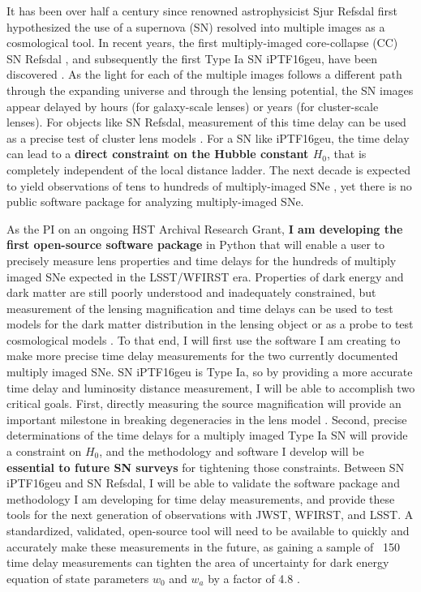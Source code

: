 It has been over half a century since renowned astrophysicist Sjur
Refsdal first hypothesized the use of a supernova (SN) resolved into
multiple images as a cosmological tool. In recent years, the first
multiply-imaged core-collapse (CC) SN Refsdal \citep{Kelly:2015a}, and
subsequently the first Type Ia SN iPTF16geu, have been discovered
\citep{Goobar:2016}. As the light for each of the multiple images
follows a different path through the expanding universe and through
the lensing potential, the SN images appear delayed by hours (for
galaxy-scale lenses) or years (for cluster-scale lenses). For objects
like SN Refsdal, measurement of this time delay can be used as a
precise test of cluster lens models \citep{Treu:2015}. For a SN like
iPTF16geu, the time delay can lead to a \textbf{direct constraint on the
Hubble constant $H_0$}, that is completely independent of the local
distance ladder. The next decade is expected to yield observations of
tens to hundreds of multiply-imaged SNe \citep{Oguri:2010}, yet there
is no public software package for analyzing multiply-imaged SNe.

As the PI on an ongoing HST Archival Research Grant, \textbf{I am developing
the first open-source software package} in Python that will enable a user to
precisely measure lens properties and time delays for the hundreds of
multiply imaged SNe expected in the LSST/WFIRST era. Properties of
dark energy and dark matter are still poorly understood and
inadequately constrained, but measurement of the lensing magnification
and time delays can be used to test models for the dark matter
distribution in the lensing object \citep{Rodney:2015a,Rodney:2016} or
as a probe to test cosmological models \citep{Suyu:2014}. To that end,
I will first use the software I am creating to make more precise time
delay measurements for the two currently documented multiply imaged
SNe. SN iPTF16geu is Type Ia, so by providing a more accurate time
delay and luminosity distance measurement, I will be able to
accomplish two critical goals. First, directly measuring the source
magnification will provide an important milestone in breaking
degeneracies in the lens
model \citep{Kolatt:1998,Oguri:2003b}. Second, precise determinations
of the time delays for a multiply imaged Type Ia SN will provide a
constraint on $H_0$, and the methodology and software I develop will
be \textbf{essential to future SN surveys} for tightening those
constraints. Between SN iPTF16geu and SN Refsdal, I will be able to
validate the software package and methodology I am developing for time
delay measurements, and provide these tools for the next generation of
observations with JWST, WFIRST, and LSST. A standardized, validated,
open-source tool will need to be available to quickly and accurately
make these measurements in the future, as gaining a sample of ~150
time delay measurements can tighten the area of uncertainty for dark
energy equation of state parameters $w_0$ and $w_a$ by a factor of
4.8 \citep{Linder:2011}.

